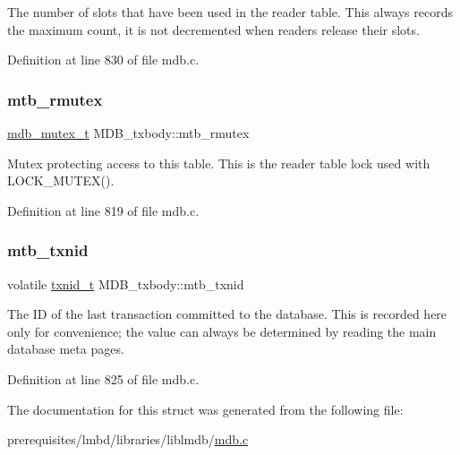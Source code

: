 The number of slots that have been used in the reader table. This always records the maximum count, it is not decremented when readers release their slots. 

Definition at line 830 of file mdb.\+c.

\mbox{\label{struct_m_d_b__txbody_a75967346ee7bfa5375b274970aeca917}} 
\subsubsection{\texorpdfstring{mtb\+\_\+rmutex}{mtb\_rmutex}}
{\footnotesize\ttfamily \mbox{\hyperlink{group__compat_ga9b7b61d0ad68b601d11d93e5c1193391}{mdb\+\_\+mutex\+\_\+t}} M\+D\+B\+\_\+txbody\+::mtb\+\_\+rmutex}

Mutex protecting access to this table. This is the reader table lock used with L\+O\+C\+K\+\_\+\+M\+U\+T\+E\+X(). 

Definition at line 819 of file mdb.\+c.

\mbox{\label{struct_m_d_b__txbody_afa59f10a949b2bfb9a7107fb80b7bc48}} 
\subsubsection{\texorpdfstring{mtb\+\_\+txnid}{mtb\_txnid}}
{\footnotesize\ttfamily volatile \mbox{\hyperlink{group__internal_gabbaef7c9c710f8652a62c32d748c040e}{txnid\+\_\+t}} M\+D\+B\+\_\+txbody\+::mtb\+\_\+txnid}

The ID of the last transaction committed to the database. This is recorded here only for convenience; the value can always be determined by reading the main database meta pages. 

Definition at line 825 of file mdb.\+c.



The documentation for this struct was generated from the following file\+:\begin{DoxyCompactItemize}
\item 
prerequisites/lmbd/libraries/liblmdb/\mbox{\hyperlink{mdb_8c}{mdb.\+c}}\end{DoxyCompactItemize}
